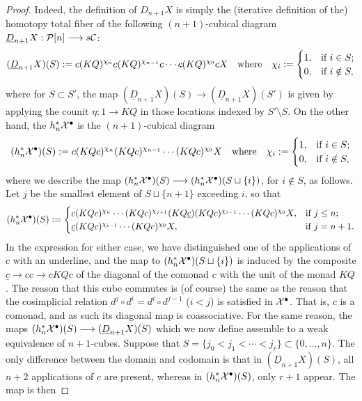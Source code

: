\documentclass[11pt]{amsart}
\theoremstyle{plain}
\begin{document}
\begin{proof}
Indeed, the definition of $D_{n+1}X$ is simply the (iterative definition of the) homotopy total fiber of the following $(n+1)$-cubical diagram $\underline{D}_{n+1}X:\mathcal{P}[n]\longrightarrow s\mathcal{C}$:
\[(\underline{D}_{n+1}X)(S):= c(KQ)^{\chi_{n}}c(KQ)^{\chi_{n-1}}c\cdots c(KQ)^{\chi_0}cX\quad \textup{where}\quad \chi_i:=\begin{cases}
1,&\textup{if }i\in S;\\
0,&\textup{if }i\notin S,
\end{cases}
\]
where for $S\subset S'$, the map $(\underline{D}_{n+1}X)(S)\to (\underline{D}_{n+1}X)(S')$ is given by applying the counit $\eta:1\to KQ$ in those locations indexed by $S'\setminus S$. On the other hand, the $h_n^*\mathcal{X}^\bullet$ is the $(n+1)$-cubical diagram
\[(h_n^*\mathcal{X}^\bullet)(S):= c(KQc)^{\chi_{n}}(KQc)^{\chi_{n-1}}\cdots (KQc)^{\chi_0}X\quad \textup{where}\quad \chi_i:=\begin{cases}
1,&\textup{if }i\in S;\\
0,&\textup{if }i\notin S,
\end{cases}
\]
where we describe the map $(h_n^*\mathcal{X}^\bullet)(S)\longrightarrow (h_n^*\mathcal{X}^\bullet)(S\sqcup\{i\})$, for $i\notin S$, as follows. Let $j$ be the smallest element of $S\sqcup\{n+1\}$ exceeding $i$, so that
\[(h_n^*\mathcal{X}^\bullet)(S):= \begin{cases}
c(KQc)^{\chi_{n}}\cdots (KQc)^{\chi_{j+1}}(KQ\underline{c})(KQc)^{\chi_{i-1}}\cdots (KQc)^{\chi_0}X,&\textup{if }j\leq n;\\
\underline{c}(KQc)^{\chi_{i-1}}\cdots (KQc)^{\chi_0}X,&\textup{if }j=n+1.
\end{cases}
\]
In the expression for either case, we have distinguished one of the applications of $c$ with an underline, and the map to $(h_n^*\mathcal{X}^\bullet)(S\sqcup\{i\})$ is induced by the composite $\underline{c}\to cc\to cKQc$ of the diagonal of the comonad $c$ with the unit of the monad $KQ$. The reason that this cube commutes is (of course) the same as the reason that the cosimplicial relation $d^j\circ d^i=d^i\circ d^{j-1}$ ($i<j$) is satisfied in $\mathcal{X}^\bullet$. That is, $c$ is a comonad, and as such its diagonal map is coassociative. For the same reason, the maps $(h_n^*\mathcal{X}^\bullet)(S)\longrightarrow (\underline{D}_{n+1}X)(S)$ which we now define assemble to a weak equivalence of $n+1$-cubes. Suppose that $S=\{j_0<j_1<\cdots<j_r\}\subset\{0,\ldots,n\}$. 
The only difference between the domain and codomain is that in $(\underline{D}_{n+1}X)(S)$, all $n+2$ applications of $c$ are present, whereas in $(h_n^*\mathcal{X}^\bullet)(S)$, only $r+1$ appear. The map is then

\end{proof}
\end{document}
